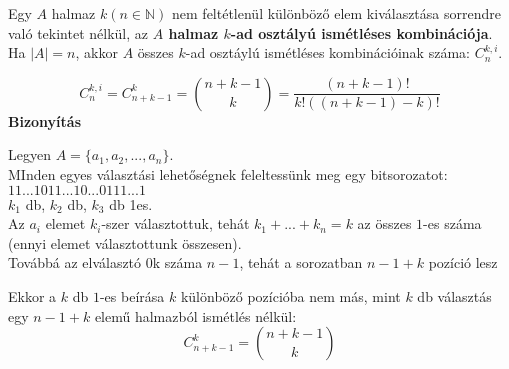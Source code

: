 \begin{frame}
  \begin{tcolorbox}[title={Def.: Ismétléses Kombináció}]
    Egy $A$ halmaz $k (n \in \mathbb{N})$ nem feltétlenül különböző elem kiválasztása sorrendre való tekintet nélkül, az \textbf{$A$ halmaz  $k$-ad osztályú ismétléses kombinációja}.\\
    Ha $|A| = n$, akkor $A$ összes $k$-ad osztáylú ismétléses kombinációinak száma: $C_n^{k, i}$.
  \end{tcolorbox}

  \begin{tcolorbox}[title={Tétel: Ismétléses kombinációk száma}]
    $$C_n^{k, i} = C_{n + k -1}^k = {{n + k - 1}\choose{k}} = \frac{(n + k - 1)!}{k!((n + k - 1) - k)!}$$
  \tcblower
    \textbf{Bizonyítás}\\
    \mmedskip

    Legyen $A = \{a_1, a_2, ..., a_n\}$.\\
    MInden egyes választási lehetőségnek feleltessünk meg egy bitsorozatot:\\
    $1 1 ... 1 0 1 1 ... 1 0 ... 0 1 1 1 ... 1$\\
    $k_1$ db,    $k_2$ db,         $k_3$ db 1es.\\
    Az $a_i$ elemet $k_i$-szer választottuk, tehát $k_1 + ... + k_n = k$ az összes $1$-es száma (ennyi elemet választottunk összesen).\\
    Továbbá az elválasztó $0$k száma $n - 1$, tehát a sorozatban $n - 1 + k$ pozíció lesz\\
    \mmedskip

    Ekkor a $k$ db $1$-es beírása $k$ különböző pozícióba nem más, mint $k$ db választás egy $n - 1 + k$ elemű halmazból ismétlés nélkül:\\
    $$C_{n + k - 1}^k = {n + k - 1 \choose k}$$
  \end{tcolorbox}
\end{frame}

